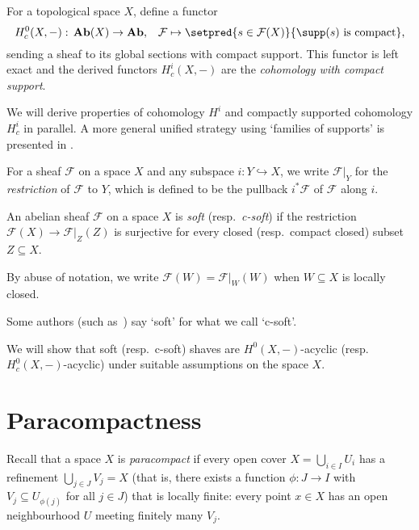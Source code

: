 \begin{defn}
For a topological space \(X\), define a functor
\[ H^0_c(X,-)\colon\catAbelianSheaf(X)\to\catAbelianGroup\text{,}\quad\mathcal F\mapsto\setpred{s\in\mathcal F(X)}{\supp(s)\text{ is compact}}\text{,} \]
sending a sheaf to its global sections with compact support.
This functor is left exact and the derived functors \(H^i_c(X,-)\) are the \emph{cohomology with compact support}.
\end{defn}

We will derive properties of cohomology \(H^i\) and compactly supported cohomology \(H^i_c\) in parallel.
A more general unified strategy using `families of supports' is presented in \cite[\S~\RN{2}.9]{BredonSheafTheory}.

For a sheaf \(\mathcal F\) on a space \(X\) and any subspace \(i\colon Y\hookrightarrow X\), we write \(\mathcal F|_Y\) for the \emph{restriction} of \(\mathcal F\) to \(Y\), which is defined to be the pullback \(i^*\mathcal F\) of \(\mathcal F\) along \(i\).

\begin{defn}
An abelian sheaf \(\mathcal F\) on a space \(X\) is \emph{soft} (resp.~\emph{c-soft}) if the restriction \(\mathcal F(X)\to\mathcal F|_Z(Z)\) is surjective for every closed (resp.~compact closed) subset \(Z\subseteq X\).
\end{defn}

By abuse of notation, we write \(\mathcal F(W)=\mathcal F|_W(W)\) when \(W\subseteq X\) is locally closed.

\begin{rmk}
Some authors (such as~\cite{IversenCohomologyOfSheaves}) say `soft' for what we call `c-soft'.
\end{rmk}

We will show that soft (resp.~c-soft) shaves are \(H^0(X,-)\)-acyclic (resp.~\(H^0_c(X,-)\)-acyclic) under suitable assumptions on the space \(X\).

\section{Paracompactness}
\noindent
Recall that a space \(X\) is \emph{paracompact} if every open cover \(X=\bigcup_{i\in I}U_i\) has a refinement \(\bigcup_{j\in J}V_j=X\) (that is, there exists a function \(\phi\colon J\to I\) with \(V_j\subseteq U_{\phi(j)}\) for all \(j\in J\)) that is locally finite: every point \(x\in X\) has an open neighbourhood \(U\) meeting finitely many \(V_j\).

